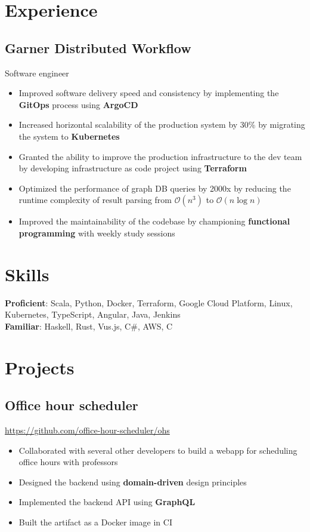 \documentclass[letterpaper,12pt,oneside]{article}
\newcommand{\smallurl}[1]{\footnotesize{\url{#1}}\normalsize}
\begin{document}
\section*{Experience}
\subsection*{Garner Distributed Workflow \hfill {}}
Software engineer
\begin{itemize}
    \setlength\itemsep{0em}
    \item Improved software delivery speed and consistency by implementing the \textbf{GitOps} process using \textbf{ArgoCD}
    \item Increased horizontal scalability of the production system by 30\% by migrating the system to \textbf{Kubernetes}
    \item Granted the ability to improve the production infrastructure to the dev team by developing infrastructure as code project using \textbf{Terraform}
    \item Optimized the performance of graph DB queries by 2000x by reducing the runtime complexity of result parsing from $\mathcal{O}(n^3)$ to $\mathcal{O}(n\log{}n)$
    \item Improved the maintainability of the codebase by championing \textbf{functional programming} with weekly study sessions
\end{itemize}

\section*{Skills}
\textbf{Proficient}:
Scala, Python, Docker, Terraform, Google Cloud Platform, Linux,
Kubernetes, TypeScript, Angular, Java, Jenkins \\
\textbf{Familiar}:
Haskell, Rust, Vus.js, C\#, AWS, C

\section*{Projects}

\subsection*{Office hour scheduler \hfill {}}
\smallurl{https://github.com/office-hour-scheduler/ohs}
\begin{itemize}
    \setlength\itemsep{0em}
    \item Collaborated with several other developers to build a webapp for scheduling office hours with professors
    \item Designed the backend using \textbf{domain-driven} design principles
    \item Implemented the backend API using \textbf{GraphQL}
    \item Built the artifact as a Docker image in CI
\end{itemize}
\end{document}
